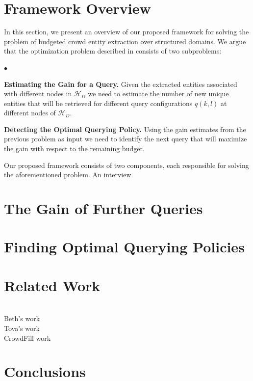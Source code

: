 \documentclass{sig-alternate}
\newcommand{\squishlist}{
   \begin{list}{$\bullet$}
    {
      \setlength{\itemsep}{0pt}
      \setlength{\parsep}{3pt}
      \setlength{\topsep}{3pt}
      \setlength{\partopsep}{0pt}
      \setlength{\leftmargin}{1.5em}
      \setlength{\labelwidth}{1em}
      \setlength{\labelsep}{0.5em} } }
\newcommand{\squishend}{
    \end{list}  }
\newcommand{\hierarchy}{\mathcal{H}_D}
\begin{document}
\section{Framework Overview}
\label{sec:framework}
In this section, we present an overview of our proposed framework for solving the problem of budgeted crowd entity extraction over structured domains. We argue that the optimization problem described in  consists of two subproblems: 
\squishlist 
\item \textbf{Estimating the Gain for a Query.} Given the extracted entities associated with different nodes in $\hierarchy$ we need to estimate the number of new unique entities that will be retrieved for different query configurations $q(k,l)$ at different nodes of $\hierarchy$. 
\item \textbf{Detecting the Optimal Querying Policy.} Using the gain estimates from the previous problem as input we need to identify the next query that will maximize the gain with respect to the remaining budget. 
\squishend

Our proposed framework consists of two components, each responsible for solving the aforementioned problem. An interview 

\section{The Gain of Further Queries}
\label{sec:gain}

\section{Finding Optimal Querying Policies}
\label{sec:solving}

\section{Related Work}
\label{sec:related}

\ \\Beth's work
\ \\Tova's work
\ \\CrowdFill work

\section{Conclusions}
\label{sec:conclusions}




\end{document}
